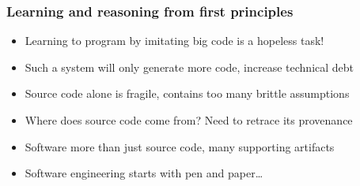 \documentclass{beamer}
\begin{document}
  \begin{frame}
    \frametitle{Learning and reasoning from first principles}
    \begin{itemize}
      \item Learning to program by imitating big code is a hopeless task!
      \item Such a system will only generate more code, increase technical debt
      \item Source code alone is fragile, contains too many brittle assumptions
      \item Where does source code come from? Need to retrace its provenance
      \item Software more than just source code, many supporting artifacts
      \item Software engineering starts with pen and paper\ldots
    \end{itemize}
    \begin{figure}[H]
      \centering


    \end{figure}
  \end{frame}
\end{document}
